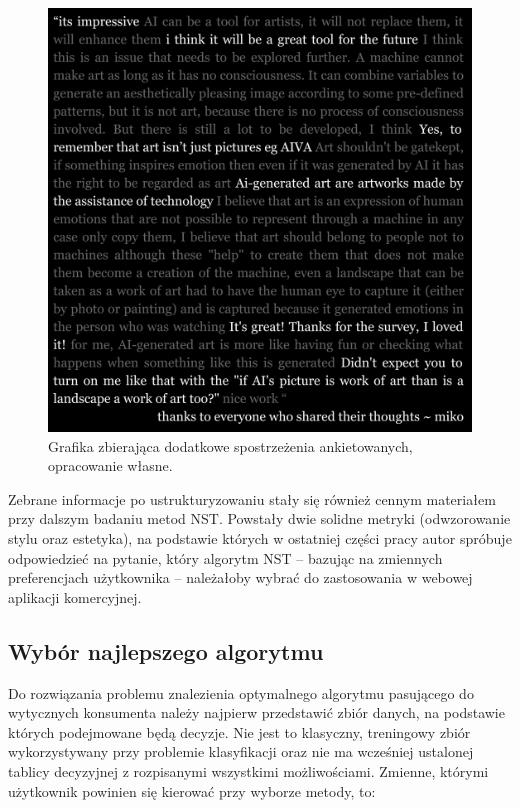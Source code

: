 \documentclass[12pt]{article}
\begin{document}
\begin{figure}[H]
    \centering
    \includegraphics[scale=0.15]{p12}
    \caption{Grafika zbierająca dodatkowe spostrzeżenia ankietowanych, opracowanie własne.}
    \label{fig:29}
\end{figure}

Zebrane informacje po ustrukturyzowaniu stały się również cennym materiałem przy dalszym badaniu metod NST. Powstały dwie solidne metryki (odwzorowanie stylu oraz estetyka), na podstawie których w ostatniej części pracy autor spróbuje odpowiedzieć na pytanie, który algorytm NST – bazując na zmiennych preferencjach użytkownika – należałoby wybrać do zastosowania w webowej aplikacji komercyjnej.

\subsection{Wybór najlepszego algorytmu}

\indent

Do rozwiązania problemu znalezienia optymalnego algorytmu pasującego do wytycznych konsumenta należy najpierw przedstawić zbiór danych, na podstawie których podejmowane będą decyzje. Nie jest to klasyczny, treningowy zbiór wykorzystywany przy problemie klasyfikacji oraz nie ma wcześniej ustalonej tablicy decyzyjnej z rozpisanymi wszystkimi możliwościami. Zmienne, którymi użytkownik powinien się kierować przy wyborze metody, to:
\end{document}
